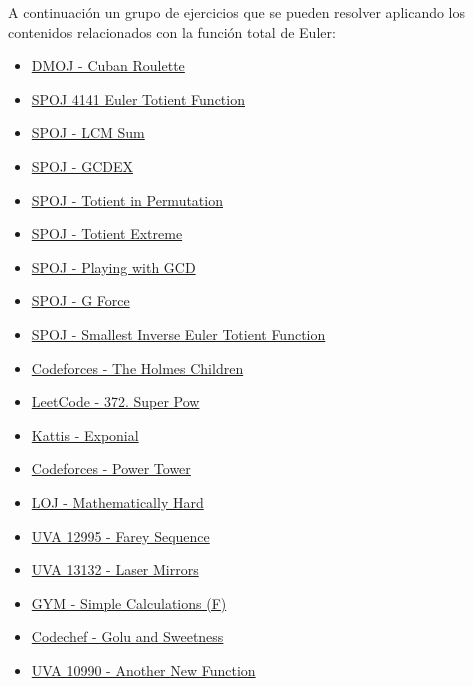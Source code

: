 A continuación un grupo de ejercicios que se pueden resolver aplicando los contenidos relacionados con la función total de Euler:

\begin{itemize}
	\item \href{https://dmoj.uclv.edu.cu/problem/oci19day1a}{DMOJ - Cuban Roulette}
	\item \href{http://www.spoj.com/problems/ETF/}{SPOJ 4141 Euler Totient Function}
	\item \href{http://www.spoj.com/problems/LCMSUM/}{SPOJ - LCM Sum}
	
	\item \href{http://www.spoj.com/problems/GCDEX/}{SPOJ - GCDEX}
	\item \href{http://www.spoj.com/problems/TIP1/}{SPOJ - Totient in Permutation}
	\item \href{http://www.spoj.com/problems/DCEPCA03/}{SPOJ - Totient Extreme}
	\item \href{http://www.spoj.com/problems/NAJPWG/}{SPOJ - Playing with GCD}
	\item \href{http://www.spoj.com/problems/DCEPC12G/}{SPOJ - G Force}
	\item \href{http://www.spoj.com/problems/INVPHI/}{SPOJ - Smallest Inverse Euler Totient Function}
	\item \href{http://codeforces.com/problemset/problem/776/E}{Codeforces - The Holmes Children}
	\item \href{https://leetcode.com/problems/super-pow/}{LeetCode - 372. Super Pow}
	\item \href{https://open.kattis.com/problems/exponial}{Kattis - Exponial}
	\item \href{http://codeforces.com/problemset/problem/906/D}{Codeforces - Power Tower}
	\item \href{http://lightoj.com/volume_showproblem.php?problem=1007}{LOJ - Mathematically Hard}
	\item \href{https://uva.onlinejudge.org/index.php?option=com_onlinejudge&Itemid=8&page=show_problem&problem=4878}{UVA 12995 - Farey Sequence}
	\item \href{https://uva.onlinejudge.org/index.php?option=com_onlinejudge&Itemid=8&page=show_problem&problem=5043}{UVA 13132 - Laser Mirrors}
	\item \href{http://codeforces.com/gym/100975}{GYM - Simple Calculations (F)}
	\item \href{https://www.codechef.com/problems/COZIE}{Codechef - Golu and Sweetness}
	\item \href{https://uva.onlinejudge.org/index.php?option=onlinejudge&page=show_problem&problem=1931}{UVA 10990 - Another New Function}

\end{itemize}
